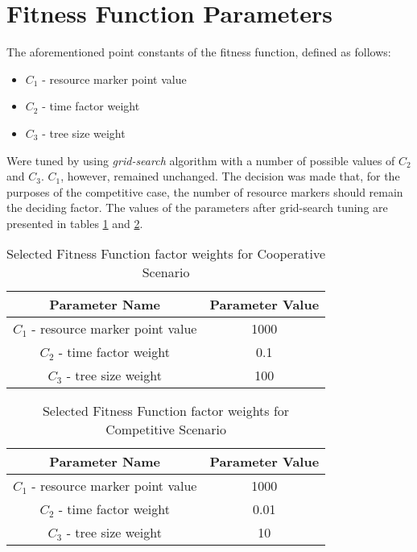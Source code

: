 \section{Fitness Function Parameters}
The aforementioned point constants of the fitness function, defined as follows:
\begin{itemize}
    \item $C_1$ - resource marker point value
    \item $C_2$ - time factor weight
    \item $C_3$ - tree size weight
\end{itemize}
Were tuned by using \textit{grid-search} algorithm with a number of possible values of $C_2$ and $C_3$. $C_1$, however, remained unchanged. The decision was made that, for the purposes of the competitive case, the number of resource markers should remain the deciding factor.
The values of the parameters after grid-search tuning are presented in tables \ref{table:x tunedfitnessfunctionparameterscoop} and \ref{table:x tunedfitnessfunctionparameterscomp}.
\begin{table} [h]
    \centering
    \begin{tabular} {c c}
        \hline \hline
        Parameter Name & Parameter Value \\
        \hline
        $C_1$ - resource marker point value & 1000 \\
        $C_2$ - time factor weight & 0.1 \\
        $C_3$ - tree size weight & 100 \\
    \end{tabular}
    \caption{Selected Fitness Function factor weights for Cooperative Scenario}
    \label{table:x tunedfitnessfunctionparameterscoop}
\end{table}


\begin{table} [h]
    \centering
    \begin{tabular} {c c}
        \hline \hline
        Parameter Name & Parameter Value \\
        \hline
        $C_1$ - resource marker point value & 1000 \\
        $C_2$ - time factor weight & 0.01 \\
        $C_3$ - tree size weight & 10 \\
    \end{tabular}
    \caption{Selected Fitness Function factor weights for Competitive Scenario}
    \label{table:x tunedfitnessfunctionparameterscomp}
\end{table}
